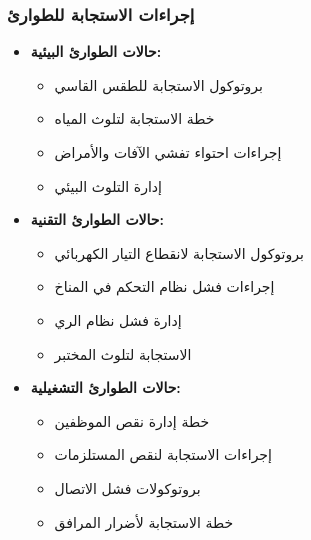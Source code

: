\subsubsection{إجراءات الاستجابة للطوارئ}
\begin{itemize}
    \item \textbf{حالات الطوارئ البيئية:}
    \begin{itemize}
        \item بروتوكول الاستجابة للطقس القاسي
        \item خطة الاستجابة لتلوث المياه
        \item إجراءات احتواء تفشي الآفات والأمراض
        \item إدارة التلوث البيئي
    \end{itemize}
    
    \item \textbf{حالات الطوارئ التقنية:}
    \begin{itemize}
        \item بروتوكول الاستجابة لانقطاع التيار الكهربائي
        \item إجراءات فشل نظام التحكم في المناخ
        \item إدارة فشل نظام الري
        \item الاستجابة لتلوث المختبر
    \end{itemize}
    
    \item \textbf{حالات الطوارئ التشغيلية:}
    \begin{itemize}
        \item خطة إدارة نقص الموظفين
        \item إجراءات الاستجابة لنقص المستلزمات
        \item بروتوكولات فشل الاتصال
        \item خطة الاستجابة لأضرار المرافق
    \end{itemize}
\end{itemize}

